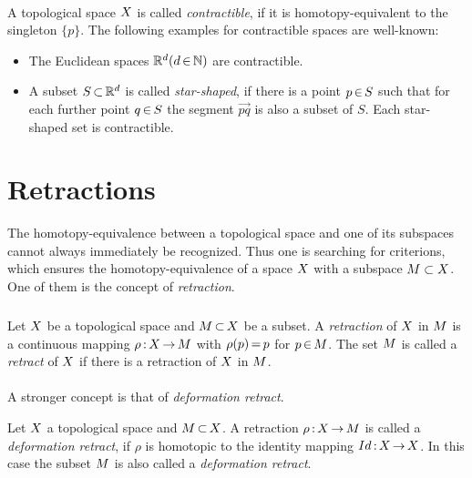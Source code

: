 \documentclass[11pt,twoside]{article}
\begin{document}
\paragraph{}
A topological space $X$ is called \textit{contractible},
if it is homotopy-equivalent to the singleton $\{p\}$.
The following examples for contractible spaces are well-known:

\begin{itemize}[leftmargin=22pt]
\item[1.]
The Euclidean spaces ${\mathbb{R}}^d (d {\,\in\,} {\mathbb{N}})$ are contractible.

\item[2.]
A subset $S {\,\subset\,} {\mathbb{R}}^d$ is called \textit{star-shaped},
if there is a point $p {\,\in\,} S$
such that
for each further point $q {\,\in\,} S$
the segment $\vec{pq}$ is also a subset of $S$.
Each star-shaped set is contractible.
\end{itemize}

\section{Retractions}
The homotopy-equivalence between a topological space
and one of its subspaces cannot always immediately be recognized.
Thus one is searching for criterions,
which ensures the homotopy-equivalence of a space $X$
with a subspace $M \subset X$.
One of them is the concept of \textit{retraction}.

\subparagraph{}
Let $X$ be a topological space and $M {\,\subset\,} X$ be a subset.
A \textit{retraction} of $X$ in $M$ is a continuous mapping
$\rho {\,:\,} X {\,\to\,} M$ with $\rho(p) {\,=\,} p$ for $p {\,\in\,} M$.
The set $M$ is called a \textit{retract} of $X$
if there is a retraction of $X$ in $M$.

\paragraph{}
A stronger concept is that of \textit{deformation retract}.

\begin{definition} %
Let $X$ a topological space and $M {\,\subset\,} X$.
A retraction $\rho {\,:\,} X {\,\to\,} M$ is called a \textit{deformation retract},
if $\rho$ is homotopic to the identity mapping $Id {\,:\,} X {\,\to\,} X$.
In this case the subset $M$ is also called a \textit{deformation retract}.
\end{definition}
\end{document}
